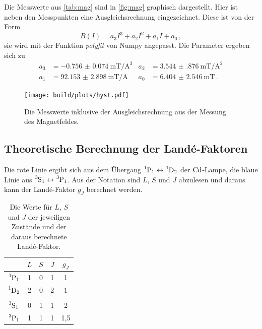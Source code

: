   \noindent Die Messwerte aus \autoref{tab:mag} sind in \autoref{fig:mag} graphisch dargestellt. Hier ist neben den Messpunkten eine 
  Ausgleichsrechnung eingezeichnet. Diese ist von der Form 
  \begin{equation}
    B(I) = a_3 I^3 + a_2 I^2 + a_1 I + a_0\, ,
    \label{eqn:bfield}
  \end{equation}
  sie wird mit der Funktion \textit{polyfit} von Numpy angepasst. Die Parameter ergeben sich zu 
  \begin{align*}
    a_3 & = \SI{-0.756(74)}{\milli\tesla\per\ampere\tothe{3}} & a_2 & = \SI{3.544(876)}{\milli\tesla\per\ampere\squared} \\
    a_1 & = \SI{92.153(2898)}{\milli\tesla\per\ampere} & a_0 & = \SI{6.404(2546)}{\milli\tesla}  \, .
  \end{align*}

  \begin{figure}[H]%
    \centering%
    \texttt{[image: build/plots/hyst.pdf]}%
    \caption{Die Messwerte inklusive der Ausgleichsrechnung aus der Messung des Magnetfeldes.}%
    \label{fig:mag}%
  \end{figure}%

\subsection{Theoretische Berechnung der Land\'{e}-Faktoren}

  \noindent 
  Die rote Linie ergibt sich aus dem Übergang $\ce{^1P_1} \leftrightarrow \ce{^1D_2}$ der $\ce{Cd}$-Lampe, die blaue Linie aus 
  $\ce{^3S_1} \leftrightarrow \ce{^3P_1}$. Aus der Notation sind $L$, $S$ und $J$ 
  abzulesen und daraus kann der Land\'{e}-Faktor $g_{J}$ berechnet werden.  
  \begin{table}[H]
    \centering
    \caption{Die Werte für $L$, $S$ und $J$ der jeweiligen Zustände und der daraus berechnete Land\'{e}-Faktor.}
    \begin{tabular}{c c c c c}
      \toprule
       & $L$ & $S$ & $J$ & $g_J$ \\ 
      \midrule
       $\ce{^1P_1}$ & 1 & 0 & 1 & 1 \\
       $\ce{^1D_2}$ & 2 & 0 & 2 & 1 \\
       \\ 
       $\ce{^3S_1}$ & 0 & 1 & 1 & 2 \\
       $\ce{^3P_1}$ & 1 & 1 & 1 & 1,5\\
      \bottomrule
    \end{tabular}
  \end{table}

